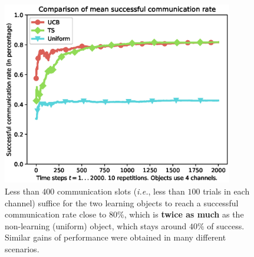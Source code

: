\begin{figure}[!t]
	\centering
    \includegraphics[height=8.0cm]{plot_datafile_append_Uniform_vs_UCB_vs_TS.eps}
    \caption{Less than $400$ communication slots (\emph{i.e.}, less than $100$ trials in each channel) suffice for the two learning objects to reach a successful communication rate close to $80\%$, which is \textbf{twice as much} as the non-learning (uniform) object, which stays around $40\%$ of success. Similar gains of performance were obtained in many different scenarios.}
    \label{fig:42:plot_datafile_append_Uniform_vs_UCB_vs_TS}
\end{figure}




